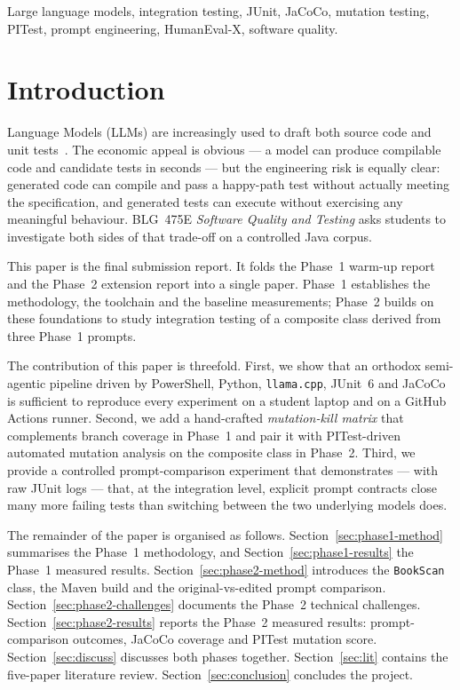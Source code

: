 \documentclass[journal]{IEEEtran}
\begin{document}
\begin{IEEEkeywords}
Large language models, integration testing, JUnit, JaCoCo, mutation
testing, PITest, prompt engineering, HumanEval-X, software quality.
\end{IEEEkeywords}

\section{Introduction}\label{sec:intro}
 Language Models (LLMs) are increasingly used to
draft both source code and unit tests~\cite{chatunitest,metatestgen,
yang2024,panta2024,lit_review}. The economic appeal is obvious --- a model
can produce compilable code and candidate tests in seconds --- but the
engineering risk is equally clear: generated code can compile and pass a
happy-path test without actually meeting the specification, and generated
tests can execute without exercising any meaningful behaviour. BLG~475E
\emph{Software Quality and Testing} asks students to investigate both
sides of that trade-off on a controlled Java corpus.

This paper is the final submission report. It folds the Phase~1 warm-up
report and the Phase~2 extension report into a single paper. Phase~1
establishes the methodology, the toolchain and the baseline
measurements; Phase~2 builds on these foundations to study integration
testing of a composite class derived from three Phase~1 prompts.

The contribution of this paper is threefold. First, we show that an
orthodox semi-agentic pipeline driven by PowerShell, Python,
\texttt{llama.cpp}, JUnit~6 and JaCoCo is sufficient to reproduce every
experiment on a student laptop and on a GitHub Actions runner. Second, we
add a hand-crafted \emph{mutation-kill matrix} that complements branch
coverage in Phase~1 and pair it with PITest-driven automated mutation
analysis on the composite class in Phase~2. Third, we provide a
controlled prompt-comparison experiment that demonstrates --- with raw
JUnit logs --- that, at the integration level, explicit prompt contracts
close many more failing tests than switching between the two underlying
models does.

The remainder of the paper is organised as follows.
Section~\ref{sec:phase1-method} summarises the Phase~1 methodology, and
Section~\ref{sec:phase1-results} the Phase~1 measured results.
Section~\ref{sec:phase2-method} introduces the \texttt{BookScan} class,
the Maven build and the original-vs-edited prompt comparison.
Section~\ref{sec:phase2-challenges} documents the Phase~2 technical
challenges. Section~\ref{sec:phase2-results} reports the Phase~2
measured results: prompt-comparison outcomes, JaCoCo coverage and PITest
mutation score. Section~\ref{sec:discuss} discusses both phases together.
Section~\ref{sec:lit} contains the five-paper literature review.
Section~\ref{sec:conclusion} concludes the project.
\end{document}

